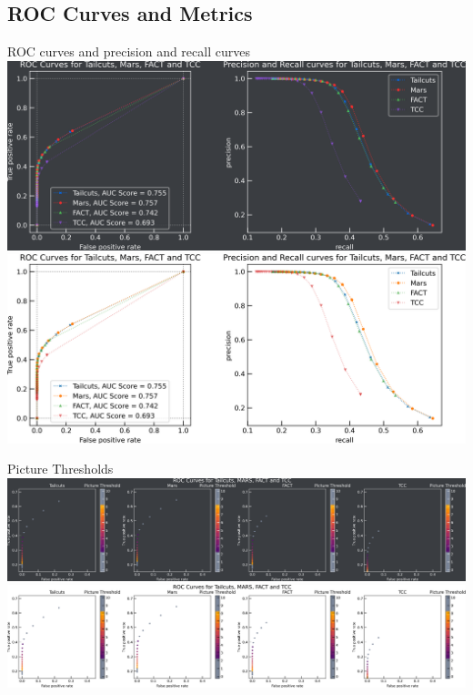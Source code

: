 \subsection{ROC Curves and Metrics}
\begin{frame}{ROC curves and precision and recall curves}
  \ifdefined\darktheme
    \centering
    \includegraphics[width=\textwidth]{plots/roc_prec_rec_duo_dark.png}
  \else
    \centering
    \includegraphics[width=\textwidth]{plots/roc_prec_rec_duo_light.png}
  \fi
\end{frame}
\begin{frame}{Picture Thresholds}
  \ifdefined\darktheme
    \centering
    \includegraphics[width=\textwidth]{plots/pic_thresh_roc_dark.png}
  \else
    \centering
    \includegraphics[width=\textwidth]{plots/pic_thresh_roc_light.png}
  \fi
\end{frame}

